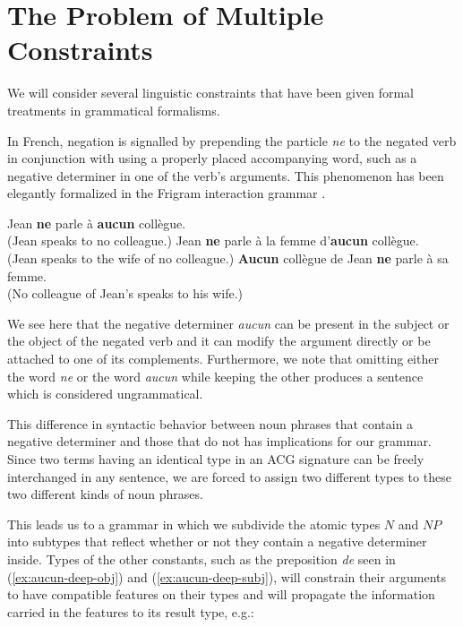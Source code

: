 \documentclass[twocolumn]{article}
\begin{document}
\section{The Problem of Multiple Constraints}
\label{sec:constraints}

We will consider several linguistic constraints that have been given
formal treatments in grammatical formalisms.

In French, negation is signalled by prepending the particle \emph{ne} to
the negated verb in conjunction with using a properly placed
accompanying word, such as a negative determiner in one of the verb's
arguments. This phenomenon has been elegantly formalized in the Frigram
interaction grammar \cite{perrier2007french}.

\begin{exe}
  \ex \label{ex:aucun-shallow} Jean \textbf{ne} parle à \textbf{aucun} collègue. \\
      (Jean speaks to no colleague.)
  \ex \label{ex:aucun-deep-obj} Jean \textbf{ne} parle à la femme d'\textbf{aucun} collègue. \\
      (Jean speaks to the wife of no colleague.)
  \ex \label{ex:aucun-deep-subj} \textbf{Aucun} collègue de Jean \textbf{ne} parle à sa femme. \\
      (No colleague of Jean's speaks to his wife.)
\end{exe}

We see here that the negative determiner \emph{aucun} can be present in
the subject or the object of the negated verb and it can modify the
argument directly or be attached to one of its complements. Furthermore,
we note that omitting either the word \emph{ne} or the word \emph{aucun}
while keeping the other produces a sentence which is considered
ungrammatical.

This difference in syntactic behavior between noun phrases that contain
a negative determiner and those that do not has implications for our
grammar. Since two terms having an identical type in an ACG signature
can be freely interchanged in any sentence, we are forced to assign two
different types to these two different kinds of noun phrases.


This leads us to a grammar in which we subdivide the atomic types $N$
and $NP$ into subtypes that reflect whether or not they contain a
negative determiner inside. Types of the other constants, such as the
preposition \emph{de} seen in (\ref{ex:aucun-deep-obj}) and
(\ref{ex:aucun-deep-subj}), will constrain their arguments to have
compatible features on their types and will propagate the information
carried in the features to its result type, e.g.:
\end{document}
